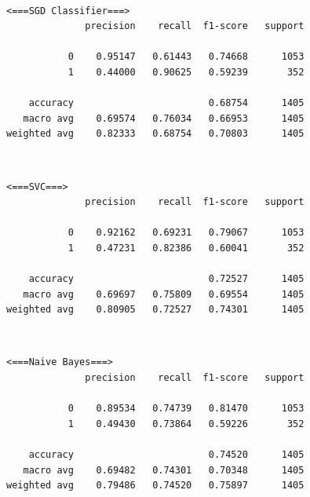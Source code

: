 \documentclass[11pt]{article}
\begin{document}
    \begin{center}
    \end{center}
    { \hspace*{\fill} \\}
    
    \begin{Verbatim}[commandchars=\\\{\}]
 <===SGD Classifier===>
              precision    recall  f1-score   support

           0    0.95147   0.61443   0.74668      1053
           1    0.44000   0.90625   0.59239       352

    accuracy                        0.68754      1405
   macro avg    0.69574   0.76034   0.66953      1405
weighted avg    0.82333   0.68754   0.70803      1405

    \end{Verbatim}

    \begin{center}
    \end{center}
    { \hspace*{\fill} \\}
    
    \begin{Verbatim}[commandchars=\\\{\}]
 <===SVC===>
              precision    recall  f1-score   support

           0    0.92162   0.69231   0.79067      1053
           1    0.47231   0.82386   0.60041       352

    accuracy                        0.72527      1405
   macro avg    0.69697   0.75809   0.69554      1405
weighted avg    0.80905   0.72527   0.74301      1405

    \end{Verbatim}

    \begin{center}
    \end{center}
    { \hspace*{\fill} \\}
    
    \begin{Verbatim}[commandchars=\\\{\}]
 <===Naive Bayes===>
              precision    recall  f1-score   support

           0    0.89534   0.74739   0.81470      1053
           1    0.49430   0.73864   0.59226       352

    accuracy                        0.74520      1405
   macro avg    0.69482   0.74301   0.70348      1405
weighted avg    0.79486   0.74520   0.75897      1405

    \end{Verbatim}
\end{document}
